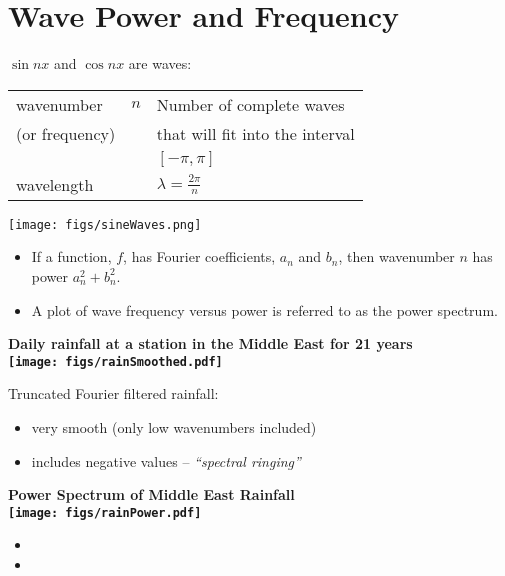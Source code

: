 \section{Wave Power and Frequency}

\begin{minipage}{0.55\linewidth}
\setlength{\parskip}{6pt}
\setlength{\parindent}{0pt}
$\sin nx$ and $\cos nx$ are waves:

\setlength{\tabcolsep}{4pt}
\begin{tabular}{lcl}
wavenumber & $n$ & Number of complete waves \\
(or frequency) && that will fit into the interval \\
               &&$[-\pi,\pi]$\\
wavelength && $\lambda = \frac{2\pi}{n}$
\end{tabular}
\end{minipage}
\begin{minipage}{0.43\linewidth}
\texttt{[image: figs/sineWaves.png]}
\end{minipage}

\begin{itemize}
\item If a function, $f$, has Fourier coefficients, $a_n$ and $b_n$, then wavenumber $n$ has power $a_n^2+b_n^2$.

\item A plot of wave frequency versus power is referred to as the power spectrum.
\end{itemize}

\clearpage
\begin{minipage}{0.7\linewidth}\centering\bf
Daily rainfall at a station in the Middle East for 21 years\\
\texttt{[image: figs/rainSmoothed.pdf]}
\end{minipage}
\begin{minipage}{0.29\linewidth}
Truncated Fourier filtered rainfall:
\begin{itemize}
\item very smooth (only low wavenumbers included)
\item includes negative values -- {\em``spectral ringing''}
\end{itemize}
\end{minipage}
%
\begin{minipage}{0.6\linewidth}\centering\bf
Power Spectrum of Middle East Rainfall\\
\texttt{[image: figs/rainPower.pdf]}
\end{minipage}
\hfill
\begin{minipage}{0.38\linewidth}\raggedright
\begin{itemize}
\item {}
\item {}
\end{itemize}
\end{minipage}

